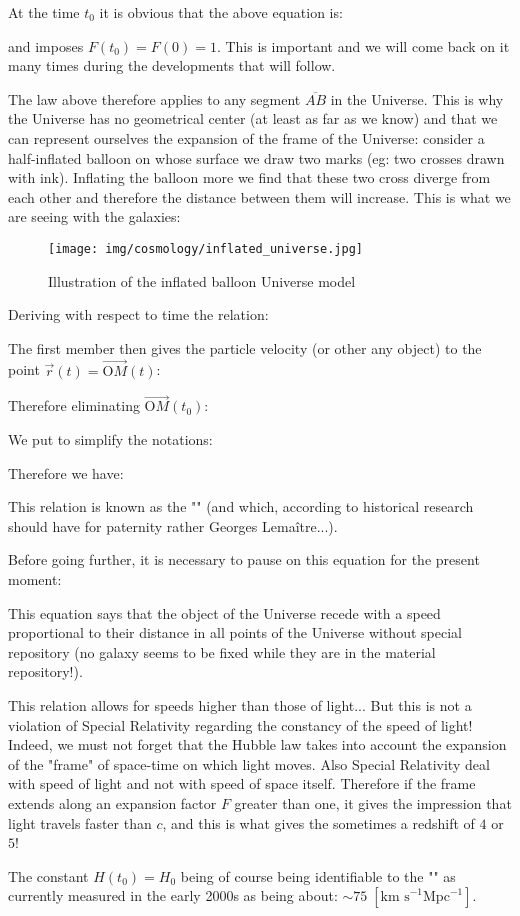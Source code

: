 	\begin{tcolorbox}[title=Remarks,colframe=black,arc=10pt]
	At the time $t_0$ it is obvious that the above equation is:
	
	and imposes $F(t_0)=F(0)=1$. This is important and we will come back on it many times during the developments that will follow.
	\end{tcolorbox}
	The law above therefore applies to any segment $\overline{AB}$ in the Universe. This is why the Universe has no geometrical center (at least as far as we know) and that we can represent ourselves the expansion of the frame of the Universe: consider a half-inflated balloon on whose surface we draw two marks (eg: two crosses drawn with ink). Inflating the balloon more we find that these two cross diverge from each other and therefore the distance between them will increase. This is what we are seeing with the galaxies:
	\begin{figure}[H]
		\begin{center}
		\texttt{[image: img/cosmology/inflated\_universe.jpg]}
		\end{center}	
		\caption{Illustration of the inflated balloon Universe model}
	\end{figure}
	
	Deriving with respect to time the relation:
	
	The first member then gives the particle velocity (or other any object) to the point $\vec{r}(t)=\overrightarrow{\text{O}M}(t)$:
	
	Therefore eliminating $\overrightarrow{\text{O}M}(t_0)$:
	
	We put to simplify the notations:
	
	Therefore we have:
	
	This relation is known as the "" (and which, according to historical research should have for paternity rather Georges Lemaître...).
	
	Before going further, it is necessary to pause on this equation for the present moment:
	
	This equation says that the object of the Universe recede with a speed proportional to their distance in all points of the Universe without special repository (no galaxy seems to be fixed while they are in the material repository!).
	\begin{tcolorbox}[title=Remark,colframe=black,arc=10pt]
	This relation allows for speeds higher than those of light... But this is not a violation of Special Relativity regarding the constancy of the speed of light! Indeed, we must not forget that the Hubble law takes into account the expansion of the "frame" of space-time on which light moves. Also Special Relativity deal with speed of light and not with speed of space itself. Therefore if the frame extends along an expansion factor $F$ greater than one, it gives the impression that light travels faster than $c$, and this is what gives the sometimes a redshift of $4$ or $5$!
	\end{tcolorbox}
	The constant $H(t_0)=H_0$ being of course being identifiable to the "" as currently measured in the early 2000s as being about: $\sim 75\; [\text{km s}^{-1} \text{Mpc}^{-1}]$.
	
